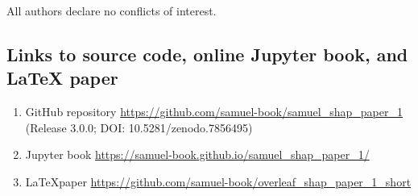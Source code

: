 All authors declare no conflicts of interest.

\subsection*{Links to source code, online Jupyter book, and LaTeX paper}
\begin{enumerate}
    \item GitHub repository \url{https://github.com/samuel-book/samuel_shap_paper_1} (Release 3.0.0; DOI: 10.5281/zenodo.7856495)
    \item Jupyter book \url{https://samuel-book.github.io/samuel_shap_paper_1/}
    \item \LaTeX paper \url{https://github.com/samuel-book/overleaf_shap_paper_1_short}
\end{enumerate}

